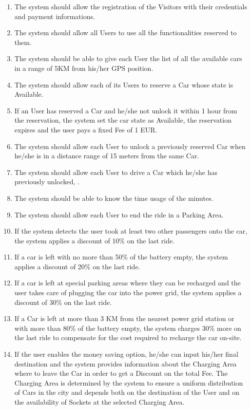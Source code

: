 \begin{enumerate}
	\item The system should allow the registration of the Visitors with their credentials and payment informations.
	\item The system should allow all Users to use all the functionalities reserved to them.
	\item The system should be able to give each User the list of all the available cars in a range of 5KM from his/her GPS position.
	\item The system should allow each of its Users to reserve a Car whose state is Available.
	\item If an User has reserved a Car and he/she not unlock it within 1 hour from the reservation, the system set the car state as Available, the reservation expires and the user pays a fixed Fee of 1 EUR.  
	\item The system should allow each User to unlock a previously reserved Car when he/she is in a distance range of 15 meters from the same Car.
	\item The system should allow each User to drive a Car which he/she has previously unlocked, .
	\item The system should be able to know the time usage of the minutes.
	\item The system should allow each User to end the ride in a Parking Area.
	\item If the system detects the user took at least two other passengers onto the car, the system applies a discount of 10\% on the last ride. 
	\item If a car is left with no more than 50\% of the battery empty, the system applies a discount of 20\% on the last ride. 
	\item If a car is left at special parking areas where they can be recharged and the user takes care of plugging the car into the power grid, the system applies a discount of 30\% on the last ride. 
	\item If a Car is left at more than 3 KM from the nearest power grid station or with more than 80\% of the battery empty, the system charges 30\% more on the last ride to compensate for the cost required to recharge the car on-site.
	\item If the user enables the money saving option, he/she can input his/her final destination and the system provides information about the Charging Area where to leave the Car in order to get a Discount on the total Fee. The Charging Area is determined by the system to ensure a uniform distribution of Cars in the city and depends both on the destination of the User and on the availability of Sockets at the selected Charging Area. 
\end{enumerate}

